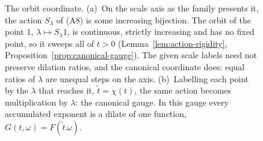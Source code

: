 \begin{figure}[!htb]
\begin{tikzpicture}[every node/.style={font=\small}, line cap=round, >=stealth]
\end{tikzpicture}
\caption{The orbit coordinate. (a)~On the scale axis as the family presents it, the action
$S_\lambda$ of (A8) is some increasing bijection. The orbit of the point $1$,
$\lambda \mapsto S_\lambda 1$, is continuous, strictly increasing and has no fixed point, so
it sweeps all of $t > 0$ (Lemma~\ref{lem:action-rigidity},
Proposition~\ref{prop:canonical-gauge}). The given scale labels need not preserve dilation
ratios, and the canonical coordinate does: equal ratios of $\lambda$ are unequal steps on the
axis. (b)~Labelling each point by the $\lambda$ that reaches it, $\tilde t = \chi(t)$, the
same action becomes multiplication by $\lambda$: the canonical gauge. In this gauge every
accumulated exponent is a dilate of one function, $G(t,\omega) = F(\tilde t\,\omega)$.}
\label{fig:orbit-gauge}
\end{figure}

